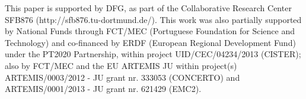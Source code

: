 \documentclass[conference]{IEEEtran}
\begin{document}
 This paper is supported by DFG, as part of the Collaborative Research Center SFB876 (http://sfb876.tu-dortmund.de/). This work was also partially supported by National Funds through FCT/MEC (Portuguese Foundation for Science and Technology) and co-financed by ERDF (European Regional Development Fund) under the PT2020 Partnership, within project UID/CEC/04234/2013 (CISTER); also by FCT/MEC and the EU ARTEMIS JU within project(s) ARTEMIS/0003/2012 - JU grant nr. 333053 (CONCERTO) and ARTEMIS/0001/2013 - JU grant nr. 621429 (EMC2).

{}
\end{document}
